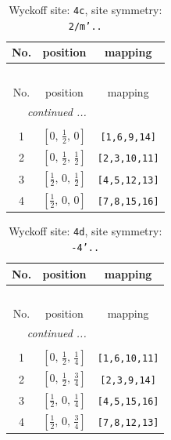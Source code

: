 \documentclass[fleqn,8pt]{jsarticle}
\begin{document}
\renewcommand{\arraystretch}{1.2}
\begin{longtable}{ccc}
\caption{Wyckoff site: {\tt 4c}, site symmetry: {\tt 2/m'..}}
 \\
 \hline \hline
No. & position & mapping \\ \hline \endfirsthead

\multicolumn{2}{l}{\tablename\ \thetable{}} \\
 \hline \hline
No. & position & mapping \\ \hline \endhead

 \hline \hline
\multicolumn{2}{r}{\footnotesize\it continued ...} \\ \endfoot

 \hline \hline
\multicolumn{2}{r}{} \\ \endlastfoot

1 & $\left[ 0,\, \frac{1}{2},\, 0 \right]$ & {\tt [1,6,9,14]} \\ \hline
2 & $\left[ 0,\, \frac{1}{2},\, \frac{1}{2} \right]$ & {\tt [2,3,10,11]} \\ \hline
3 & $\left[ \frac{1}{2},\, 0,\, \frac{1}{2} \right]$ & {\tt [4,5,12,13]} \\ \hline
4 & $\left[ \frac{1}{2},\, 0,\, 0 \right]$ & {\tt [7,8,15,16]} \\
\end{longtable}
\renewcommand{\arraystretch}{1.2}
\begin{longtable}{ccc}
\caption{Wyckoff site: {\tt 4d}, site symmetry: {\tt -4'..}}
 \\
 \hline \hline
No. & position & mapping \\ \hline \endfirsthead

\multicolumn{2}{l}{\tablename\ \thetable{}} \\
 \hline \hline
No. & position & mapping \\ \hline \endhead

 \hline \hline
\multicolumn{2}{r}{\footnotesize\it continued ...} \\ \endfoot

 \hline \hline
\multicolumn{2}{r}{} \\ \endlastfoot

1 & $\left[ 0,\, \frac{1}{2},\, \frac{1}{4} \right]$ & {\tt [1,6,10,11]} \\ \hline
2 & $\left[ 0,\, \frac{1}{2},\, \frac{3}{4} \right]$ & {\tt [2,3,9,14]} \\ \hline
3 & $\left[ \frac{1}{2},\, 0,\, \frac{1}{4} \right]$ & {\tt [4,5,15,16]} \\ \hline
4 & $\left[ \frac{1}{2},\, 0,\, \frac{3}{4} \right]$ & {\tt [7,8,12,13]} \\
\end{longtable}
\end{document}
